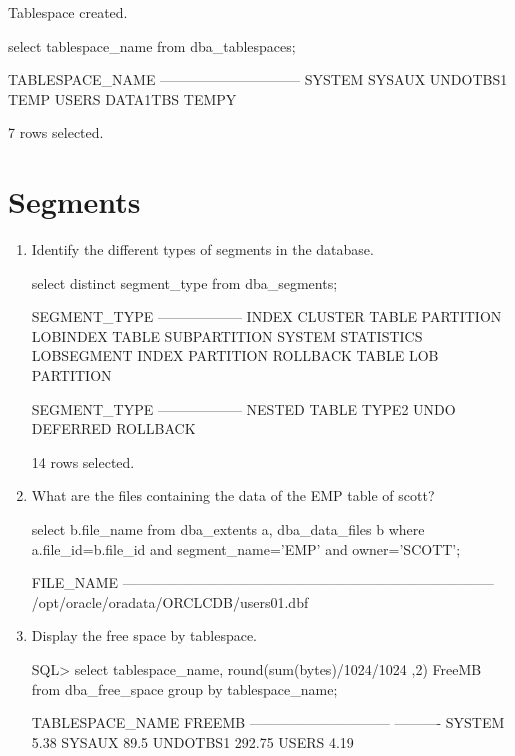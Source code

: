 \documentclass{article}
\begin{document}
\begin{enumerate}
\begin{messageshell}
Tablespace created.

\end{messageshell}
\begin{sqlshell}
select tablespace_name from dba_tablespaces;
\end{sqlshell}
\begin{messageshell}

TABLESPACE_NAME
------------------------------
SYSTEM
SYSAUX
UNDOTBS1
TEMP
USERS
DATA1TBS
TEMPY

7 rows selected.
\end{messageshell}
\end{enumerate}

\section{Segments }
\begin{enumerate}
\item{Identify the different types of segments in the database.}
\begin{sqlshell}
select distinct segment_type from dba_segments;
\end{sqlshell}
\begin{messageshell}
SEGMENT_TYPE
------------------
INDEX
CLUSTER
TABLE PARTITION
LOBINDEX
TABLE SUBPARTITION
SYSTEM STATISTICS
LOBSEGMENT
INDEX PARTITION
ROLLBACK
TABLE
LOB PARTITION

SEGMENT_TYPE
------------------
NESTED TABLE
TYPE2 UNDO
DEFERRED ROLLBACK

14 rows selected.
\end{messageshell}

\item{What are the files containing the data of the EMP table of scott?}

\begin{sqlshell}
select b.file_name from dba_extents a, dba_data_files b where a.file_id=b.file_id and segment_name='EMP' and owner='SCOTT';
\end{sqlshell}
\begin{messageshell}

FILE_NAME
--------------------------------------------------------------------------------
/opt/oracle/oradata/ORCLCDB/users01.dbf

\end{messageshell}
\item{Display the free space by tablespace. }
\begin{messageshell}
SQL> select tablespace_name, round(sum(bytes)/1024/1024 ,2) FreeMB
            from dba_free_space group by tablespace_name;
\end{messageshell}
\begin{messageshell}
TABLESPACE_NAME            FREEMB
------------------------------ ----------
SYSTEM                     5.38
SYSAUX                     89.5
UNDOTBS1               292.75
USERS                     4.19

\end{messageshell}
\end{enumerate}
\end{document}
